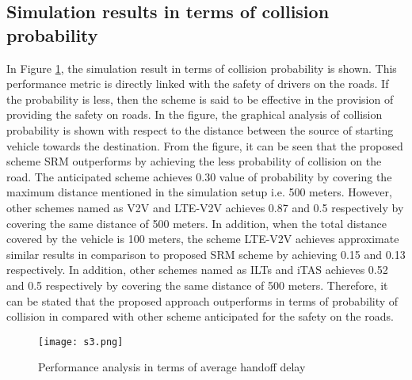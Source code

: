 \documentclass[journal,transmag]{IEEEtran}
\begin{document}
    \subsection{Simulation results in terms of collision probability}
    
    In Figure \ref{p1}, the simulation result in terms of collision probability is shown. This performance metric is directly linked with the safety of drivers on the roads. If the probability is less, then the scheme is said to be effective in the provision of providing the safety on roads. In the figure, the graphical analysis of collision probability is shown with respect to the distance between the source of starting vehicle towards the destination. From the figure, it can be seen that the proposed scheme SRM outperforms by achieving the less probability of collision on the road. The anticipated scheme achieves 0.30 value of probability by covering the maximum distance mentioned in the simulation setup i.e. 500 meters. However, other schemes named as V2V and LTE-V2V achieves 0.87 and 0.5 respectively by covering the same distance of 500 meters. In addition, when the total distance covered by the vehicle is 100 meters, the scheme LTE-V2V achieves approximate similar results in comparison to proposed SRM scheme by achieving 0.15 and 0.13 respectively. In addition, other schemes named as ILTs and iTAS achieves 0.52 and 0.5 respectively by covering the same distance of 500 meters. Therefore, it can be stated that the proposed approach outperforms in terms of probability of collision in compared with other scheme anticipated for the safety on the roads.
    
    \begin{figure}
    	\begin{center}
    		\texttt{[image: s3.png]}
    	\end{center}
    	\begin{center}
    		\caption{Performance analysis in terms of average handoff delay}

    		\label{p1}
    	\end{center}
    \end{figure}
    	
    
    
\end{document}
